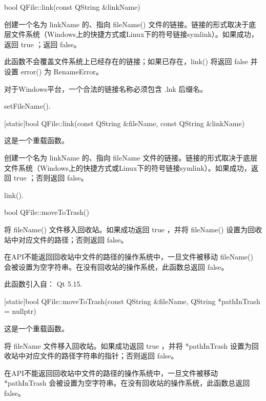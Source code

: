 bool QFile::link(const QString \&linkName)

创建一个名为 linkName 的、指向 fileName() 文件的链接。链接的形式取决于底层文件系统（Windows上的快捷方式或Linux下的符号链接symlink）。如果成功，返回 true ；返回 false。

此函数不会覆盖文件系统上已经存在的链接；如果已存在，link() 将返回 false 并设置 error() 为 RenameError。


\begin{notice}
对于Windows平台，一个合法的链接名称必须包含 .lnk 后缀名。
\end{notice} 


\begin{notice}[另请参阅]
setFileName().
\end{notice} 

[static]bool QFile::link(const QString \&fileName, const QString \&linkName)

这是一个重载函数。

创建一个名为 linkName 的、指向 fileName 文件的链接。链接的形式取决于底层文件系统（Windows上的快捷方式或Linux下的符号链接symlink）。如果成功，返回 true ；否则返回 false。



\begin{notice}[另请参阅]
link().
\end{notice} 

bool QFile::moveToTrash()

将 fileName() 文件移入回收站。如果成功返回 true ，并将 fileName() 设置为回收站中对应文件的路径；否则返回 false。
 

\begin{notice}
在API不能返回回收站中文件的路径的操作系统中，一旦文件被移动 fileName() 会被设置为空字符串。在没有回收站的操作系统，此函数总返回 false。
\end{notice} 

此函数引入自： Qt 5.15.

[static]bool QFile::moveToTrash(const QString \&fileName, QString *pathInTrash = nullptr)

这是一个重载函数。

将 fileName 文件移入回收站。如果成功返回 true ，并将 *pathInTrash 设置为回收站中对应文件的路径字符串的指针；否则返回 false。

\begin{notice}
在API不能返回回收站中文件的路径的操作系统中，一旦文件被移动 *pathInTrash 会被设置为空字符串。在没有回收站的操作系统，此函数总返回 false。
\end{notice} 

